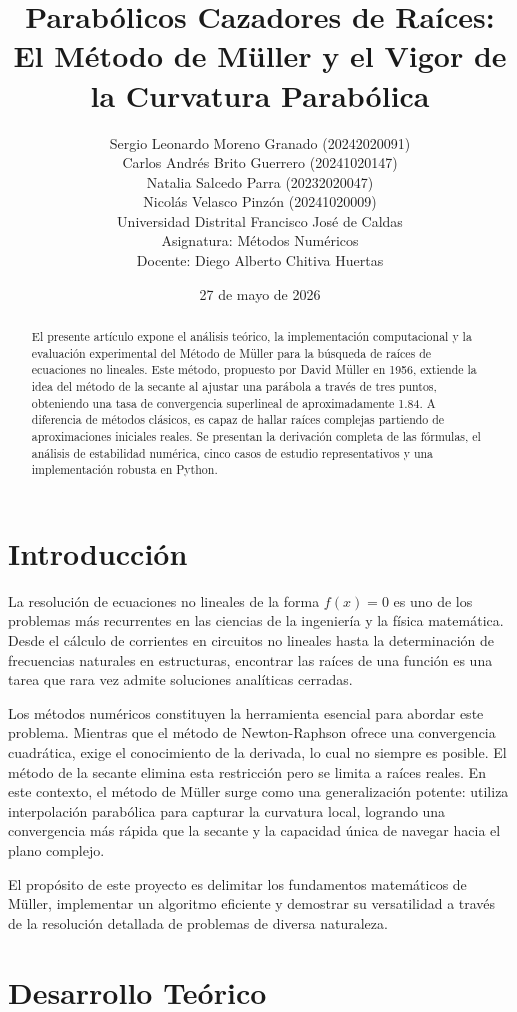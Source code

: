 \documentclass[11pt,a4paper]{article}
\title{\textbf{Parabólicos Cazadores de Raíces: \\ El Método de Müller y el Vigor de la Curvatura Parabólica}}
\author{
    Sergio Leonardo Moreno Granado (20242020091) \\
    Carlos Andrés Brito Guerrero (20241020147) \\
    Natalia Salcedo Parra (20232020047) \\
    Nicolás Velasco Pinzón (20241020009) \\
    \small Universidad Distrital Francisco José de Caldas \\
    \small Asignatura: Métodos Numéricos \\
    \small Docente: Diego Alberto Chitiva Huertas
}
\date{27 de mayo de 2026}
\begin{document}
\maketitle

\begin{abstract}
    El presente artículo expone el análisis teórico, la implementación computacional y la evaluación experimental del Método de Müller para la búsqueda de raíces de ecuaciones no lineales. Este método, propuesto por David Müller en 1956, extiende la idea del método de la secante al ajustar una parábola a través de tres puntos, obteniendo una tasa de convergencia superlineal de aproximadamente 1.84. A diferencia de métodos clásicos, es capaz de hallar raíces complejas partiendo de aproximaciones iniciales reales. Se presentan la derivación completa de las fórmulas, el análisis de estabilidad numérica, cinco casos de estudio representativos y una implementación robusta en Python.
\end{abstract}

\section{Introducción}
La resolución de ecuaciones no lineales de la forma $f(x) = 0$ es uno de los problemas más recurrentes en las ciencias de la ingeniería y la física matemática. Desde el cálculo de corrientes en circuitos no lineales hasta la determinación de frecuencias naturales en estructuras, encontrar las raíces de una función es una tarea que rara vez admite soluciones analíticas cerradas.

Los métodos numéricos constituyen la herramienta esencial para abordar este problema. Mientras que el método de Newton-Raphson ofrece una convergencia cuadrática, exige el conocimiento de la derivada, lo cual no siempre es posible. El método de la secante elimina esta restricción pero se limita a raíces reales. En este contexto, el método de Müller surge como una generalización potente: utiliza interpolación parabólica para capturar la curvatura local, logrando una convergencia más rápida que la secante y la capacidad única de navegar hacia el plano complejo.

El propósito de este proyecto es delimitar los fundamentos matemáticos de Müller, implementar un algoritmo eficiente y demostrar su versatilidad a través de la resolución detallada de problemas de diversa naturaleza.

\section{Desarrollo Teórico}
\end{document}
